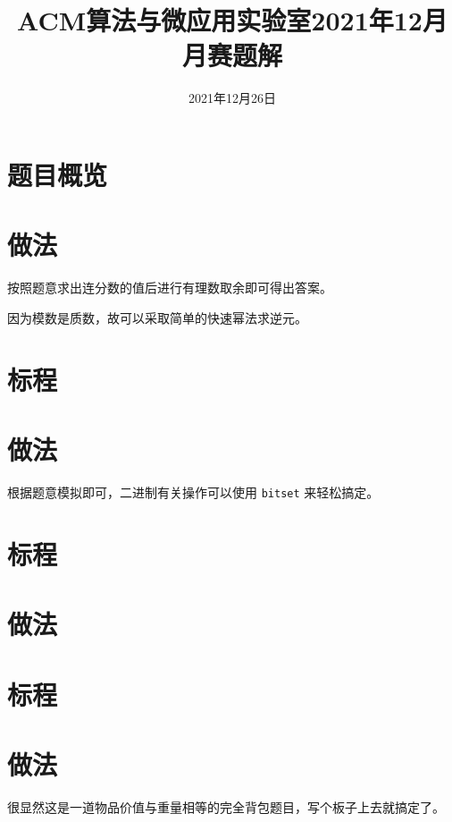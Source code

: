 \documentclass{ctsol}
\title{ACM算法与微应用实验室2021年12月月赛题解}
\date{2021年12月26日}
\begin{document}
\maketitle
{}

\section*{题目概览}
\solutiontab

\makesolution
\section*{做法}

按照题意求出连分数的值后进行有理数取余即可得出答案。

因为模数是质数，故可以采取简单的快速幂法求逆元。

\section*{标程}

\makesolution
\section*{做法}

根据题意模拟即可，二进制有关操作可以使用 \verb|bitset| 来轻松搞定。

\section*{标程}

\makesolution
\section*{做法}

\section*{标程}

\makesolution
\section*{做法}

很显然这是一道物品价值与重量相等的完全背包题目，写个板子上去就搞定了。
\end{document}
